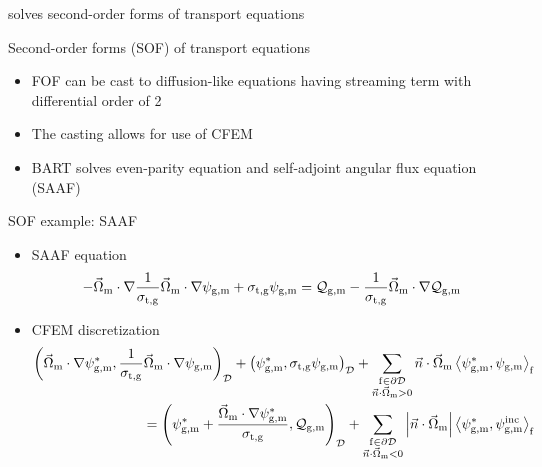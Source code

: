\begin{frame}{ solves second-order forms of transport equations}
	\begin{block}{Second-order forms (SOF) of transport equations}
		\begin{itemize}
			\item FOF can be cast to diffusion-like equations having streaming term with differential order of 2
			\item The casting allows for use of CFEM
			\item BART solves even-parity equation and self-adjoint angular flux equation (SAAF)
		\end{itemize}
	\end{block}
	\begin{block}{SOF example: SAAF}
		\begin{itemize}
			\item SAAF equation
			\begin{align}
				-\omemn\frac{1}{\sigtg}\omemn\psigm+\sigtg\psigm=\mqgm-\frac{1}{\sigtg}\omemn\mqgm
			\end{align}
			\item CFEM discretization
			\begin{align}
				\left(\omemn\psigms,\frac{1}{\sigtg}\omemn\psigm\right)_\md+\left(\psigms,{\sigtg}\psigm\right)_\md+\sum\limits_{\substack{\mm{f}\in\pd\\\ndom>0}}\ndom\left<\psigms,\psigm\right>_\mm{f}\nno\\
				=\left(\psigms+\frac{\omemn\psigms}{\sigtg},\mqgm\right)_\mm{\md}+\sum\limits_{\substack{\mm{f}\in\pd\\\ndom<0}}\absndom\left<\psigms,\psigm^\mm{inc}\right>_\mm{f}
			\end{align}
		\end{itemize}
	\end{block}
\end{frame}

